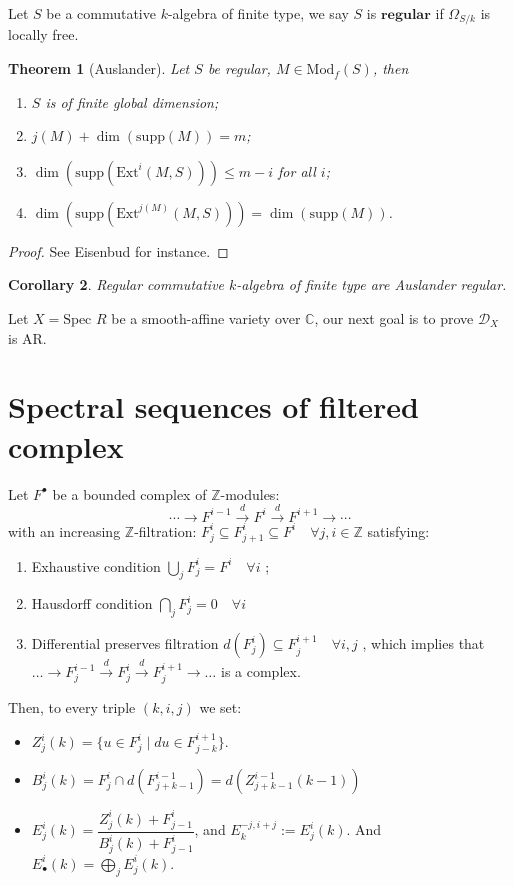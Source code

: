 \documentclass[openany]{book}
\newtheorem{theorem}{Theorem}[chapter] %
\newtheorem{corollary}[theorem]{Corollary}   %
\theoremstyle{definition} %
\theoremstyle{remark}
\begin{document}
Let $S$ be a commutative $k$-algebra of finite type, we say $S$ is $\textbf{regular}$ if $\Omega_{S/k}$ is locally free.

\begin{theorem}[Auslander]\label{theorem 7.2}
    Let $S$ be regular, $M \in \text{Mod}_{f}(S)$, then
    \begin{enumerate}
        \item $S$ is of finite global dimension;
        \item $j(M) + \dim(\text{supp}(M)) = m$;
        \item $\dim(\text{supp}(\text{Ext}^{i}(M,S))) \le m - i$ for all $i$;
        \item $\dim(\text{supp}(\text{Ext}^{j(M)}(M,S))) = \dim(\text{supp}(M))$.
    \end{enumerate}
\end{theorem}
\begin{proof}
    See Eisenbud for instance.
\end{proof}
\begin{corollary}
    Regular commutative $k$-algebra of finite type are Auslander regular.
\end{corollary}

Let $X = \text{Spec } R$ be a smooth-affine variety over $\mathbb{C}$, our next goal is to prove $\mathcal{D}_{X}$ is AR.

\section{Spectral sequences of filtered complex}

Let $F^{\bullet}$ be a bounded complex of $\mathbb{Z}$-modules:$$\cdots \to F^{i-1} \xrightarrow{d} F^i \xrightarrow{d} F^{i+1} \to \cdots$$with an increasing $\mathbb{Z}$-filtration: $F_j^i \subseteq F_{j+1}^i \subseteq F^i \quad \forall j,i \in \mathbb{Z}$ satisfying:
\begin{enumerate}
    \item Exhaustive condition $\bigcup\limits_j F_j^i = F^i \quad \forall i$ ;
    \item Hausdorff condition $\bigcap_j F_j^i = 0 \quad \forall i$
    \item  Differential preserves filtration $d(F_j^i) \subseteq F_j^{i+1} \quad \forall i,j$ , which implies that $\dots\rightarrow F_{j}^{i-1}\xrightarrow{d} F_{j}^{i}\xrightarrow{d} F_{j}^{i+1}\rightarrow\dots$ is a complex.
\end{enumerate}
Then, to every triple $(k, i, j)$ we set:
\begin{itemize}
    \item $Z_j^i(k) = \{u \in F_j^i \mid du \in F^{i+1}_{j-k}\}.$
    \item $B^{i}_{j}(k)=F^{i}_{j}\cap d(F^{i-1}_{j+k-1})=d(Z^{i-1}_{j+k-1}(k-1))$
    \item $E_j^i(k) = \dfrac{Z_j^i(k) + F_{j-1}^i}{B_j^i(k) + F_{j-1}^i}$, and $E_{k}^{-j,i+j}:=E_{j}^{i}(k)$. And $E_{\bullet}^i(k) = \bigoplus\limits_{j} E_j^i(k)$.
\end{itemize}
\end{document}
